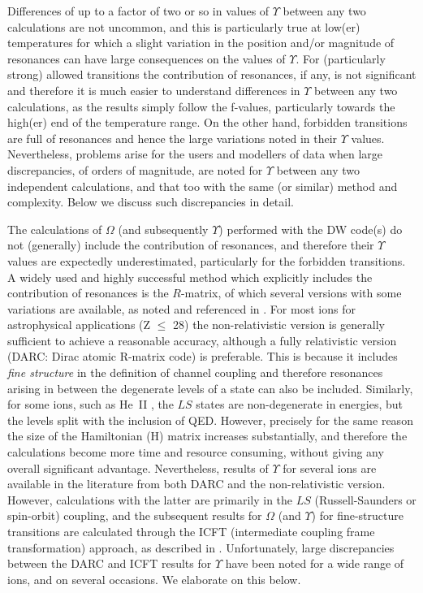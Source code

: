 \documentclass[fleqn]{article}
\begin{document}
Differences of up to a factor of two or so in values of $\Upsilon$ between any two calculations are not uncommon, and this is particularly true at low(er) temperatures for which a slight variation in the position and/or  magnitude of resonances can have large consequences on the values of $\Upsilon$. For (particularly strong) allowed transitions the contribution of resonances, if any, is not significant and therefore it is much easier to understand differences in $\Upsilon$ between any two calculations, as the results simply follow the f-values, particularly towards the high(er) end of the temperature range. On the other hand, forbidden transitions are full of resonances and hence the large variations noted in their $\Upsilon$ values. Nevertheless, problems arise for the users and modellers of data when large discrepancies, of orders of magnitude, are noted for $\Upsilon$ between any two independent calculations, and that too with the same (or similar) method and complexity. Below we discuss such discrepancies in detail. 

The calculations of $\Omega$ (and subsequently $\Upsilon$) performed with the DW code(s) do not (generally) include the contribution of resonances, and therefore their $\Upsilon$ values are expectedly underestimated, particularly for the forbidden transitions. A widely used and highly successful method which explicitly includes the contribution of resonances is the $R$-matrix, of which several versions with some variations are available, as noted and referenced in \cite{fst}. For most ions for astrophysical applications (Z $\le$ 28) the non-relativistic version is  generally sufficient to achieve a reasonable accuracy, although a fully relativistic version (DARC: Dirac atomic R-matrix code) is preferable. This is because it includes {\em fine structure} in the definition of channel coupling and therefore resonances arising in between the degenerate levels of a state can also be included.  Similarly, for some ions, such as He~II \cite{he2}, the $LS$ states are non-degenerate in energies, but the levels split with the inclusion of QED. However, precisely for the same reason the size of the Hamiltonian (H) matrix increases substantially, and therefore the calculations become more time and resource consuming, without giving any overall significant advantage. Nevertheless, results of $\Upsilon$ for several ions are available in the literature from both DARC and the non-relativistic version. However, calculations with the latter are primarily in the $LS$ (Russell-Saunders or spin-orbit) coupling, and the subsequent results for $\Omega$ (and $\Upsilon$) for  fine-structure transitions are calculated through the ICFT (intermediate coupling frame transformation) approach, as described in  \cite{icft}. Unfortunately, large discrepancies between the DARC and ICFT results for $\Upsilon$ have been noted for a wide range of ions, and on several occasions. We elaborate on this below.
\end{document}
